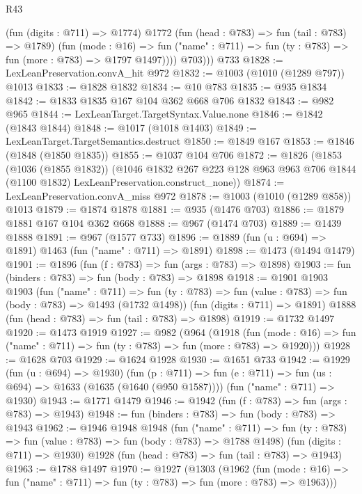 \begin{lexlean}{R43}
\begin{coremodule}
              (fun (digits : @711) => @1774)
              @1772
              (fun (head : @783) => fun (tail : @783) => @1789)
              (fun (mode : @16) =>
              fun ("name" : @711) => fun (ty : @783) => fun (more : @783) => @1797 @1497))))
          @703)))
    @733
@1828 := LexLeanPreservation.convA_hit @972
@1832 := @1003 (@1010 (@1289 @797)) @1013
@1833 := @1828 @1832
@1834 := @10 @783
@1835 := @935 @1834
@1842 := @1833 @1835 @167 @104 @362 @668 @706 @1832
@1843 := @982 @965
@1844 := LexLeanTarget.TargetSyntax.Value.none
@1846 := @1842 (@1843 @1844)
@1848 := @1017 (@1018 @1403)
@1849 := LexLeanTarget.TargetSemantics.destruct
@1850 := @1849 @167
@1853 := @1846 (@1848 (@1850 @1835))
@1855 := @1037 @104 @706
@1872 := @1826
    (@1853
      (@1036 (@1855 @1832))
      (@1046
        @1832
        @267
        @223
        @128
        @963
        @963
        @706
        @1844
        (@1100 @1832)
        LexLeanPreservation.construct_none))
@1874 := LexLeanPreservation.convA_miss @972
@1878 := @1003 (@1010 (@1289 @858)) @1013
@1879 := @1874 @1878
@1881 := @935 (@1476 @703)
@1886 := @1879 @1881 @167 @104 @362 @668
@1888 := @967 (@1474 @703)
@1889 := @1439 @1888
@1891 := @967 (@1577 @733)
@1896 := @1889 (fun (u : @694) => @1891) @1463 (fun ("name" : @711) => @1891)
@1898 := @1473 (@1494 @1479)
@1901 := @1896 (fun (f : @783) => fun (args : @783) => @1898)
@1903 := fun (binders : @783) => fun (body : @783) => @1898
@1918 := @1901
    @1903
    @1903
    (fun ("name" : @711) =>
    fun (ty : @783) => fun (value : @783) => fun (body : @783) => @1493 (@1732 @1498))
    (fun (digits : @711) => @1891)
    @1888
    (fun (head : @783) => fun (tail : @783) => @1898)
@1919 := @1732 @1497
@1920 := @1473 @1919
@1927 := @982
    (@964
      (@1918
        (fun (mode : @16) => fun ("name" : @711) => fun (ty : @783) => fun (more : @783) => @1920)))
@1928 := @1628 @703
@1929 := @1624 @1928
@1930 := @1651 @733
@1942 := @1929
    (fun (u : @694) => @1930)
    (fun (p : @711) => fun (e : @711) => fun (us : @694) => @1633 (@1635 (@1640 (@950 @1587))))
    (fun ("name" : @711) => @1930)
@1943 := @1771 @1479
@1946 := @1942 (fun (f : @783) => fun (args : @783) => @1943)
@1948 := fun (binders : @783) => fun (body : @783) => @1943
@1962 := @1946
    @1948
    @1948
    (fun ("name" : @711) =>
    fun (ty : @783) => fun (value : @783) => fun (body : @783) => @1788 @1498)
    (fun (digits : @711) => @1930)
    @1928
    (fun (head : @783) => fun (tail : @783) => @1943)
@1963 := @1788 @1497
@1970 := @1927
    (@1303
      (@1962
        (fun (mode : @16) => fun ("name" : @711) => fun (ty : @783) => fun (more : @783) => @1963)))

\end{coremodule}
\end{lexlean}
